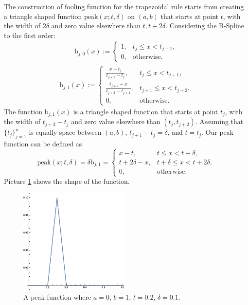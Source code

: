 \documentclass{iitthesis}
\theoremstyle{definition}
\theoremstyle{remark}
\begin{document}
The construction of fooling function for the trapezoidal rule starts from creating a triangle shaped function $\text{peak}(x;t,\delta)$ on $(a,b)$ that starts at point $t$, with the width of $2\delta$ and zero value elsewhere than $t, t+2\delta$. Considering the B-Spline to the first order:
\begin{align*}
  \text{b}_{j,0}(x):= \begin{cases} \displaystyle 1, & t_{j} \le x < t_{j+1},\\[1ex]
\displaystyle  0, & \text{otherwise}.
\end{cases}
\end{align*}
\begin{align*}
  \text{b}_{j,1}(x):= \begin{cases} \displaystyle \frac{x-t_{j}}{t_{j+1}-t_{j}}, & t_{j} \le x < t_{j+1},\\[1ex]
\displaystyle \frac{t_{j+2}-x}{t_{j+2}-t_{j+1}}, & t_{j+1} \le x < t_{j+2},\\[1ex]
\displaystyle  0, & \text{otherwise}.
\end{cases}
\end{align*}
The function $\text{b}_{j,1}(x)$ is a triangle shaped function that starts at point $t_j$, with the width of $t_{j+2}-t_{j}$ and zero value elsewhere than $(t_{j}, t_{j+2})$. Assuming that $\{t_{j}\}_{j=1}^{n}$ is equally space between $(a,b)$, $t_{j+1}-t_{j}=\delta$, and $t=t_{j}$. Our peak function can be defined as
\begin{equation}\label{peakfunction}
  \text{peak}(x;t,\delta)=\delta \text{b}_{j,1}=\begin{cases} \displaystyle x-t, & t \le x < t+\delta,\\[1ex]
\displaystyle t+2\delta-x, & t+\delta \le x < t+2\delta,\\[1ex]
\displaystyle  0, & \text{otherwise}.
\end{cases}
\end{equation}
Picture \ref{fig:peakfunction} shows the shape of the function.
\begin{figure}[ht]
\centering
\includegraphics[width=5.5cm]{peak.eps}
\caption{A peak function where $a=0$, $b=1$, $t=0.2$, $\delta=0.1$. \label{fig:peakfunction}}
\end{figure}
\end{document}
